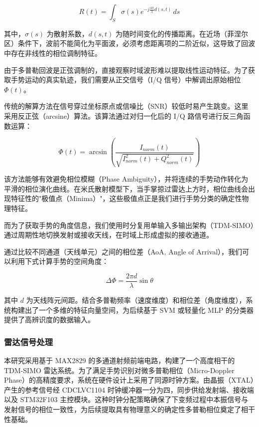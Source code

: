 \begin{equation}
    R(t) = \int_{S}\sigma(s)e^{-j\frac{4\pi}{\lambda}d(s,t)}\, ds
\end{equation}

其中，$\sigma(s)$ 为散射系数，$d(s,t)$ 为随时间变化的传播距离。在近场（菲涅尔区）条件下，波前不能简化为平面波，必须考虑距离项的二阶近似，这导致了回波中存在非线性的相位调制特征。

由于多普勒回波是正弦调制的，直接观察时域波形难以提取线性运动特征。为了获取手势运动的真实轨迹，我们需要从正交信号（I/Q 信号）中解调出原始相位 $\Phi(t)$。

传统的解算方法在信号穿过坐标原点或信噪比（SNR）较低时易产生跳变。这里采用反正弦（arcsine）算法。该算法通过对归一化后的 I/Q 路信号进行反三角函数运算：

\begin{equation}
    \Phi(t) = \arcsin\left( \frac{I_{norm}(t)}{\sqrt{I_{norm}^{2}(t) + Q_{norm}^{2}(t)}} \right)
\end{equation}

该方法能够有效避免相位模糊（Phase Ambiguity），并将连续的手势动作转化为平滑的相位演化曲线。在米氏散射模型下，当手掌掠过雷达上方时，相位曲线会出现特征性的"极值点（Minima）"，这些极值点正是我们进行手势分类的确定性物理特征。

而为了获取手势的角度信息，我们使用时分复用单输入多输出架构（TDM-SIMO）通过周期性地切换发射或接收天线，在时域上形成虚拟的接收通道。

通过比较不同通道（天线单元）之间的相位差（AoA, Angle of Arrival），我们可以利用下式计算手势的空间角度：

\begin{equation}
    \Delta\Phi = \frac{2\pi d}{\lambda}\sin\theta
\end{equation}

其中 $d$ 为天线阵元间距。结合多普勒频率（速度维度）和相位差（角度维度），系统构建出了一个多维的特征向量空间，为后续基于 SVM 或轻量化 MLP 的分类器提供了高辨识度的数据输入。

\subsubsection{雷达信号处理}

本研究采用基于 MAX2829 的多通道射频前端电路，构建了一个高度相干的 TDM-SIMO 雷达系统。为了满足手势识别对微多普勒相位（Micro-Doppler Phase）的高精度要求，系统在硬件设计上采用了同源时钟方案。由晶振（XTAL）产生的参考信号经 CDCLVC1104 时钟缓冲器一分为四，同步供给发射端、接收端以及 STM32F103 主控模块。这种时钟分配策略确保了下变频过程中本振信号与发射信号的相位一致性，为后续提取具有物理意义的确定性多普勒相位\cite{lien2016soli}奠定了相干性基础。

